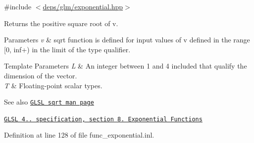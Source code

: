 {\ttfamily \#include $<$\hyperlink{exponential_8hpp}{deps/glm/exponential.\+hpp}$>$}

Returns the positive square root of v.


\begin{DoxyParams}{Parameters}
{\em v} & sqrt function is defined for input values of v defined in the range \mbox{[}0, inf+) in the limit of the type qualifier. \\
\hline
\end{DoxyParams}

\begin{DoxyTemplParams}{Template Parameters}
{\em L} & An integer between 1 and 4 included that qualify the dimension of the vector. \\
\hline
{\em T} & Floating-\/point scalar types.\\
\hline
\end{DoxyTemplParams}
\begin{DoxySeeAlso}{See also}
\href{http://www.opengl.org/sdk/docs/manglsl/xhtml/sqrt.xml}{\tt G\+L\+SL sqrt man page} 

\href{http://www.opengl.org/registry/doc/GLSLangSpec.4.20.8.pdf}{\tt G\+L\+SL 4.. specification, section 8. Exponential Functions} 
\end{DoxySeeAlso}


Definition at line 128 of file func\+\_\+exponential.\+inl.



